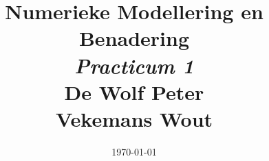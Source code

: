 \documentclass[10pt,a4paper]{article}
\begin{document}
\title{\textbf{Numerieke Modellering en Benadering}\\\textit{Practicum 1}\\
De Wolf Peter\\ Vekemans Wout}

\date{\today}

\maketitle

\newpage

\listoffigures

\newpage
\end{document}
